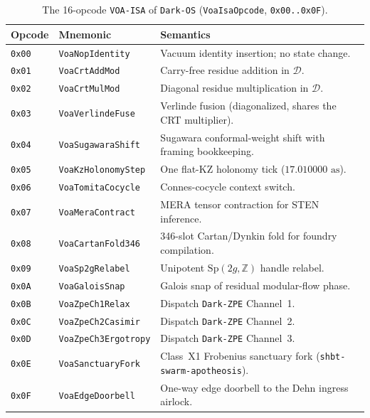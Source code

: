 \documentclass[11pt,onecolumn]{article}
\begin{document}
\begin{table}[!htbp]
\centering\small
\caption{The 16-opcode \texttt{VOA-ISA} of \texttt{Dark-OS} (\texttt{VoaIsaOpcode}, \texttt{0x00..0x0F}).}
\label{tab:v8_voa_isa}
\begin{tabularx}{\textwidth}{@{}l l X@{}}
\toprule
Opcode & Mnemonic & Semantics \\
\midrule
\texttt{0x00} & \texttt{VoaNopIdentity} & Vacuum identity insertion; no state change. \\
\texttt{0x01} & \texttt{VoaCrtAddMod} & Carry-free residue addition in $\mathcal D$. \\
\texttt{0x02} & \texttt{VoaCrtMulMod} & Diagonal residue multiplication in $\mathcal D$. \\
\texttt{0x03} & \texttt{VoaVerlindeFuse} & Verlinde fusion (diagonalized, shares the CRT multiplier). \\
\texttt{0x04} & \texttt{VoaSugawaraShift} & Sugawara conformal-weight shift with framing bookkeeping. \\
\texttt{0x05} & \texttt{VoaKzHolonomyStep} & One flat-KZ holonomy tick ($17.010000\text{ as}$). \\
\texttt{0x06} & \texttt{VoaTomitaCocycle} & Connes-cocycle context switch. \\
\texttt{0x07} & \texttt{VoaMeraContract} & MERA tensor contraction for STEN inference. \\
\texttt{0x08} & \texttt{VoaCartanFold346} & 346-slot Cartan/Dynkin fold for foundry compilation. \\
\texttt{0x09} & \texttt{VoaSp2gRelabel} & Unipotent $\mathrm{Sp}(2g,\mathbb Z)$ handle relabel. \\
\texttt{0x0A} & \texttt{VoaGaloisSnap} & Galois snap of residual modular-flow phase. \\
\texttt{0x0B} & \texttt{VoaZpeCh1Relax} & Dispatch \texttt{Dark-ZPE} Channel~1. \\
\texttt{0x0C} & \texttt{VoaZpeCh2Casimir} & Dispatch \texttt{Dark-ZPE} Channel~2. \\
\texttt{0x0D} & \texttt{VoaZpeCh3Ergotropy} & Dispatch \texttt{Dark-ZPE} Channel~3. \\
\texttt{0x0E} & \texttt{VoaSanctuaryFork} & Class~X1 Frobenius sanctuary fork (\texttt{shbt-swarm-apotheosis}). \\
\texttt{0x0F} & \texttt{VoaEdgeDoorbell} & One-way edge doorbell to the Dehn ingress airlock. \\
\bottomrule
\end{tabularx}
\end{table}
\end{document}
